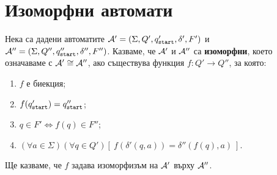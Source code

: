 \section{Изоморфни автомати}
\label{sect:isomorphic}

Нека са дадени автоматите
$\mathcal{A}' = (\Sigma,Q',q_{\texttt{start}}',\delta',F')$ и $\mathcal{A}'' = (\Sigma, Q'', q_{\texttt{start}}'', \delta'', F'')$.
Казваме, че $\mathcal{A}'$ и $\mathcal{A}''$ са {\bf изоморфни}, което означаваме с $\mathcal{A}' \cong \mathcal{A}''$, ако
съществува функция $f: Q'\to Q''$, за която:
\begin{enumerate}[(1)]
\item
  $f$ е биекция;
\item
  $f(q_{\texttt{start}}') = q_{\texttt{start}}''$;
\item
  $q \in F' \iff f(q) \in F''$;
\item
  $(\forall a\in\Sigma)(\forall q\in Q')[\ f(\delta'(q,a)) = \delta''(f(q),a)\ ]$.
\end{enumerate}
Ще казваме, че $f$ задава изоморфизъм на $\mathcal{A}'$ върху $\mathcal{A}''$.

